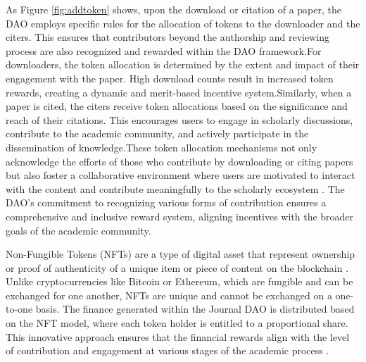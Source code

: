 \documentclass[lettersize,journal]{IEEEtran}
\begin{document}
As Figure \ref{fig:addtoken} shows, upon the download or citation of a paper, the DAO employs specific rules for the allocation of tokens to the downloader and the citers. This ensures that contributors beyond the authorship and reviewing process are also recognized and rewarded within the DAO framework.For downloaders, the token allocation is determined by the extent and impact of their engagement with the paper. High download counts result in increased token rewards, creating a dynamic and merit-based incentive system.Similarly, when a paper is cited, the citers receive token allocations based on the significance and reach of their citations. This encourages users to engage in scholarly discussions, contribute to the academic community, and actively participate in the dissemination of knowledge.These token allocation mechanisms not only acknowledge the efforts of those who contribute by downloading or citing papers but also foster a collaborative environment where users are motivated to interact with the content and contribute meaningfully to the scholarly ecosystem \cite{9994617}. The DAO's commitment to recognizing various forms of contribution ensures a comprehensive and inclusive reward system, aligning incentives with the broader goals of the academic community.


Non-Fungible Tokens (NFTs) are a type of digital asset that represent ownership or proof of authenticity of a unique item or piece of content on the blockchain \cite{wang2021non}. Unlike cryptocurrencies like Bitcoin or Ethereum, which are fungible and can be exchanged for one another, NFTs are unique and cannot be exchanged on a one-to-one basis.
The finance generated within the Journal DAO is distributed based on the NFT model, where each token holder is entitled to a proportional share. This innovative approach ensures that the financial rewards align with the level of contribution and engagement at various stages of the academic process \cite{nadini2021mapping}.
\end{document}
